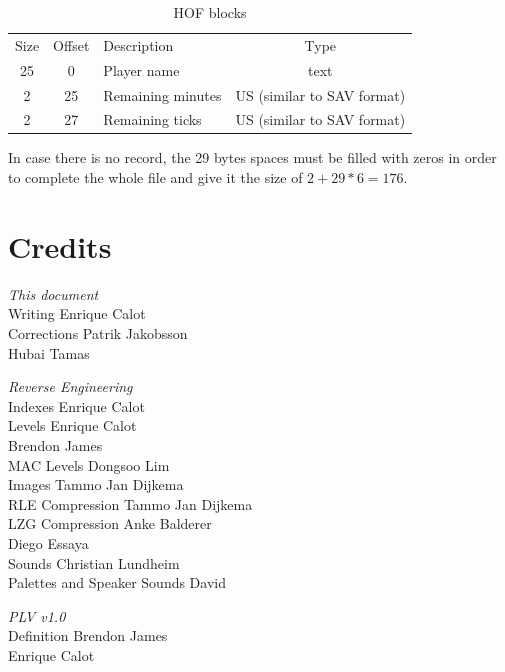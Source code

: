\documentclass{article}
\begin{document}
\begin{table}
\begin{tabular}{cclc}
\hline
   Size& Offset & Description                 & Type \\
     25     & 0 & Player name                 & text \\
      2    & 25 & Remaining minutes           & US (similar to SAV format) \\
      2    & 27 & Remaining ticks             & US (similar to SAV format) \\
\hline
\end{tabular}
\caption{HOF blocks}
\label{palettes table}
\end{table}

 In case there is no record, the 29 bytes spaces must be filled with zeros
 in order to complete the whole file and give it the size of $2+29*6 = 176$.

\pagebreak[3]
\section{Credits}
\begin{center}
\parbox{11.6cm}{
\raggedright {\it This document} \\
  Writing                     \dotfill Enrique Calot \\
  Corrections                 \dotfill Patrik Jakobsson \\
                           \raggedleft Hubai Tamas \\ 
\bigskip
\pagebreak[2]
\raggedright {\it Reverse Engineering} \\
  Indexes                     \dotfill Enrique Calot \\
  Levels                      \dotfill Enrique Calot \\
                           \raggedleft Brendon James \\
  MAC Levels                  \dotfill Dongsoo Lim \\
  Images                      \dotfill Tammo Jan Dijkema \\
  RLE Compression             \dotfill Tammo Jan Dijkema \\
  LZG Compression             \dotfill Anke Balderer \\
                           \raggedleft Diego Essaya \\
  Sounds                      \dotfill Christian Lundheim \\
  Palettes and Speaker Sounds \dotfill David \\
\bigskip
\pagebreak[2]
\raggedright {\it PLV v1.0} \\
  Definition                  \dotfill Brendon James \\
                           \raggedleft Enrique Calot \\
}
\end{center}
\end{document}
